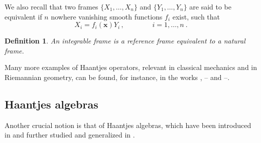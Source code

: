\documentclass[10pt]{amsart}
\numberwithin{equation}{section}
\newcommand\noi{\noindent}
\newtheorem{definition}{Definition}
\theoremstyle{definition}
\begin{document}
	We also recall that two frames $\{X_1,\ldots,X_n\}$ and $\{Y_1,\ldots,Y_n\}$ are said to be equivalent if $n$ nowhere vanishing smooth
	functions $f_i$ exist, such that
	\begin{equation}
		X_i= f_i(\boldsymbol{x}) Y_i \, , \qquad\qquad i=1,\ldots,n \ .
	\end{equation}
	
	\begin{definition}\label{def:Iframe}
		An \emph{integrable} frame is a reference frame equivalent to a natural frame.
	\end{definition}
	
	
	\par
	\noi Many more examples of Haantjes operators, relevant in classical mechanics and in Riemannian geometry, can be found, for instance, in the works \cite{KRTT2024PRA}, \cite{RTT2022CNS}--\cite{RTT2024AMPA} and \cite{TT2021JGP}--\cite{TT2016SIGMA}.
	
	\subsection{Haantjes algebras}
	
	
	
	Another crucial notion is that of Haantjes algebras, which have been introduced in \cite{TT2021JGP} and further studied and generalized in \cite{RTT2023JNS}. 
	
	
	
\end{document}
